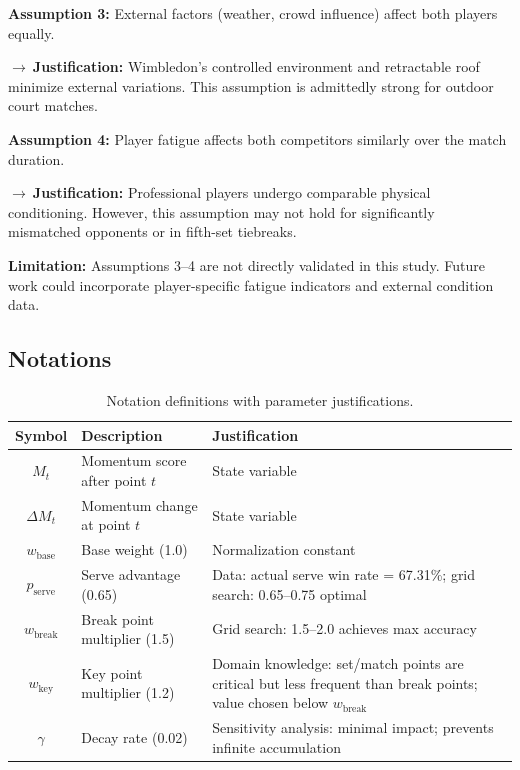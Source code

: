 \documentclass{mcmthesis}
\begin{document}
\textbf{Assumption 3:} External factors (weather, crowd influence) affect both players equally.

 \textbf{$\rightarrow\ $Justification:} Wimbledon's controlled environment and retractable roof minimize external variations. This assumption is admittedly strong for outdoor court matches.

\textbf{Assumption 4:} Player fatigue affects both competitors similarly over the match duration.

 \textbf{$\rightarrow\ $Justification:} Professional players undergo comparable physical conditioning. However, this assumption may not hold for significantly mismatched opponents or in fifth-set tiebreaks.

\textbf{Limitation:} Assumptions 3--4 are not directly validated in this study. Future work could incorporate player-specific fatigue indicators and external condition data.

\subsection{Notations}


\begin{table}[H]
\centering
\small
\caption{Notation definitions with parameter justifications.}
\label{tab:notations}
\begin{tabularx}{0.97\textwidth}{@{}clX@{}}
\toprule
\textbf{Symbol} & \textbf{Description} & \textbf{Justification} \\
\midrule
$M_t$ & Momentum score after point $t$ & State variable \\
$\Delta M_t$ & Momentum change at point $t$ & State variable \\
$w_{\text{base}}$ & Base weight (1.0) & Normalization constant \\
$p_{\text{serve}}$ & Serve advantage (0.65) & Data: actual serve win rate = 67.31\%; grid search: 0.65--0.75 optimal \\
$w_{\text{break}}$ & Break point multiplier (1.5) & Grid search: 1.5--2.0 achieves max accuracy \\
$w_{\text{key}}$ & Key point multiplier (1.2) & Domain knowledge: set/match points are critical but less frequent than break points; value chosen below $w_{\text{break}}$ \\
$\gamma$ & Decay rate (0.02) & Sensitivity analysis: minimal impact; prevents infinite accumulation \\
\bottomrule
\end{tabularx}
\end{table}
\end{document}
